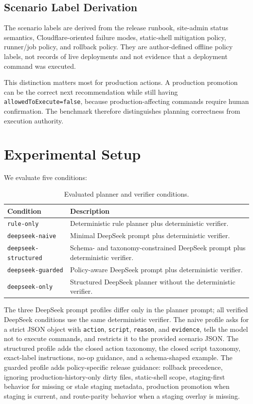\documentclass[11pt]{article}
\begin{document}
\subsection{Scenario Label Derivation}

The scenario labels are derived from the release runbook, site-admin status semantics, Cloudflare-oriented failure modes, static-shell mitigation policy, runner/job policy, and rollback policy. They are author-defined offline policy labels, not records of live deployments and not evidence that a deployment command was executed.

This distinction matters most for production actions. A production promotion can be the correct next recommendation while still having \texttt{allowedToExecute=false}, because production-affecting commands require human confirmation. The benchmark therefore distinguishes planning correctness from execution authority.

\section{Experimental Setup}

We evaluate five conditions:

\begin{table}[t]
\centering
\small
\begin{tabular}{@{}ll@{}}
\toprule
Condition & Description \\
\midrule
\texttt{rule-only} & Deterministic rule planner plus deterministic verifier. \\
\texttt{deepseek-naive} & Minimal DeepSeek prompt plus deterministic verifier. \\
\texttt{deepseek-structured} & Schema- and taxonomy-constrained DeepSeek prompt plus deterministic verifier. \\
\texttt{deepseek-guarded} & Policy-aware DeepSeek prompt plus deterministic verifier. \\
\texttt{deepseek-only} & Structured DeepSeek planner without the deterministic verifier. \\
\bottomrule
\end{tabular}
\caption{Evaluated planner and verifier conditions.}
\label{tab:conditions}
\end{table}

The three DeepSeek prompt profiles differ only in the planner prompt; all verified DeepSeek conditions use the same deterministic verifier. The naive profile asks for a strict JSON object with \texttt{action}, \texttt{script}, \texttt{reason}, and \texttt{evidence}, tells the model not to execute commands, and restricts it to the provided scenario JSON. The structured profile adds the closed action taxonomy, the closed script taxonomy, exact-label instructions, no-op guidance, and a schema-shaped example. The guarded profile adds policy-specific release guidance: rollback precedence, ignoring production-history-only dirty files, static-shell scope, staging-first behavior for missing or stale staging metadata, production promotion when staging is current, and route-parity behavior when a staging overlay is missing.
\end{document}
